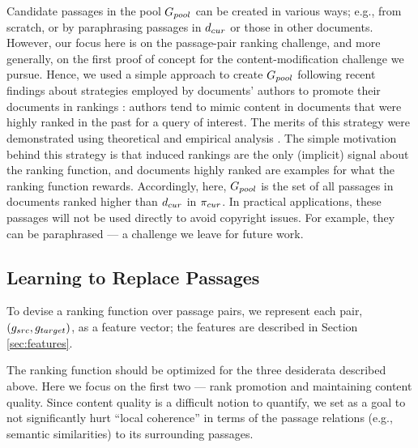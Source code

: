Candidate passages in the pool $G_{pool}$ can be created in various
ways; e.g., from scratch, or by paraphrasing passages in $d_{cur}$ or
those in other documents. However, our focus here is on the passage-pair
ranking challenge, and more generally, on the first proof of concept for the content-modification challenge we pursue. Hence, we used a simple approach to create $G_{pool}$
following recent findings about strategies employed by
documents' authors to promote their documents in rankings \cite{Raifer+al:17a}: authors tend to mimic content in documents that were highly
ranked in the past for a query of interest. The
merits of this strategy were demonstrated using theoretical and
empirical analysis \cite{Raifer+al:17a}. The simple motivation behind this strategy is
that induced rankings are the only (implicit) signal about the ranking
function, and documents highly ranked are examples for what the
ranking function rewards. Accordingly, here, $G_{pool}$ is
the set of all passages in documents ranked higher than $d_{cur}$ in
$\pi_{cur}$. In practical applications, these passages will not be used directly to avoid copyright issues. For example, they can be paraphrased --- a challenge we leave for future work.



\subsection{Learning to Replace Passages}
\label{sec:labels}
To devise a ranking function over passage pairs, we represent
each pair, $(g_{src},g_{target})$, as a feature vector; the features
are described in Section \ref{sec:features}.



The ranking function should be optimized for the
three desiderata described above. Here we focus on the first two ---
rank promotion and maintaining content quality. Since content quality
is a difficult notion to quantify, we set as a goal to not
significantly hurt ``local coherence'' in terms of the passage relations (e.g., semantic similarities) to its surrounding passages.





